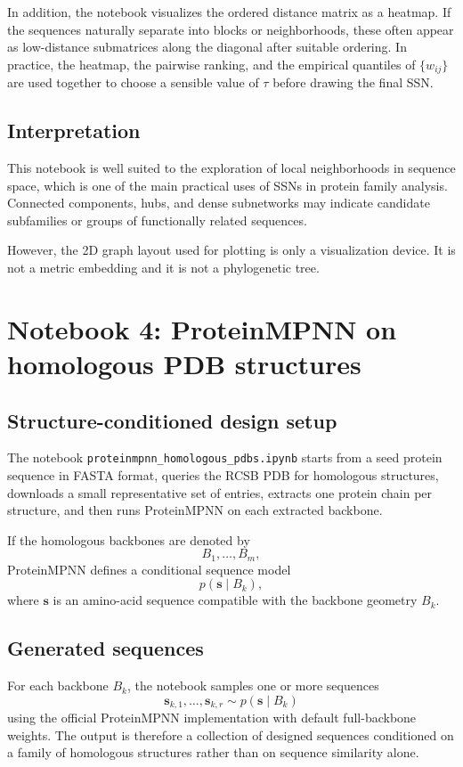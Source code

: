 \documentclass[11pt,a4paper]{article}
\begin{document}
In addition, the notebook visualizes the ordered distance matrix as a heatmap. If the sequences naturally separate into blocks or neighborhoods, these often appear as low-distance submatrices along the diagonal after suitable ordering. In practice, the heatmap, the pairwise ranking, and the empirical quantiles of $\{w_{ij}\}$ are used together to choose a sensible value of $\tau$ before drawing the final SSN.

\subsection{Interpretation}

This notebook is well suited to the exploration of local neighborhoods in sequence space, which is one of the main practical uses of SSNs in protein family analysis. Connected components, hubs, and dense subnetworks may indicate candidate subfamilies or groups of functionally related sequences.

However, the 2D graph layout used for plotting is only a visualization device. It is not a metric embedding and it is not a phylogenetic tree.

\section{Notebook 4: ProteinMPNN on homologous PDB structures}

\subsection{Structure-conditioned design setup}

The notebook \texttt{proteinmpnn\_homologous\_pdbs.ipynb} starts from a seed protein sequence in FASTA format, queries the RCSB PDB for homologous structures, downloads a small representative set of entries, extracts one protein chain per structure, and then runs ProteinMPNN on each extracted backbone.

If the homologous backbones are denoted by
\[
B_1,\dots,B_m,
\]
ProteinMPNN defines a conditional sequence model
\[
p(\bm{s}\mid B_k),
\]
where $\bm{s}$ is an amino-acid sequence compatible with the backbone geometry $B_k$.

\subsection{Generated sequences}

For each backbone $B_k$, the notebook samples one or more sequences
\[
\bm{s}_{k,1},\dots,\bm{s}_{k,r}\sim p(\bm{s}\mid B_k)
\]
using the official ProteinMPNN implementation with default full-backbone weights. The output is therefore a collection of designed sequences conditioned on a family of homologous structures rather than on sequence similarity alone.
\end{document}
